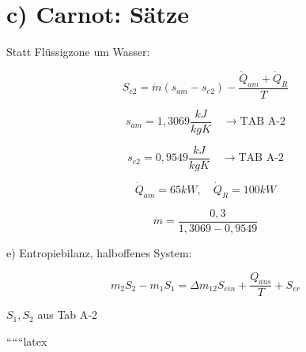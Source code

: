 \section*{c) Carnot: Sätze}

Statt Flüssigzone um Wasser:

\[
S_{e2} = \dot{m} (s_{am} - s_{e2}) - \frac{\dot{Q}_{am} + \dot{Q}_R}{T}
\]

\[
s_{am} = 1{,}3069 \frac{kJ}{kgK} \quad \rightarrow \text{TAB A-2}
\]

\[
s_{e2} = 0{,}9549 \frac{kJ}{kgK} \quad \rightarrow \text{TAB A-2}
\]

\[
\dot{Q}_{am} = 65 kW, \quad \dot{Q}_R = 100 kW
\]

\[
\dot{m} = \frac{0{,}3}{1{,}3069 - 0{,}9549}
\]

e) Entropiebilanz, halboffenes System:

\[
m_2 S_2 - m_1 S_1 = \Delta m_{12} S_{ein} + \frac{Q_{aus}}{T} + S_{er}
\]

$S_1, S_2$ aus Tab A-2

``````latex